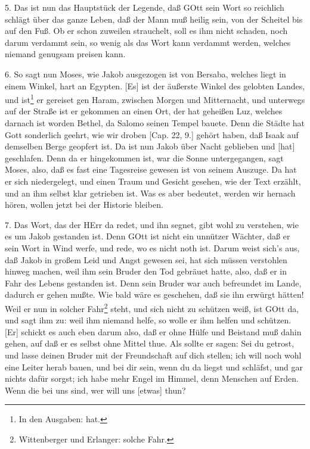 5. Das ist nun das Hauptstück der Legende, daß GOtt sein Wort so reichlich schlägt über das ganze Leben, daß der Mann muß heilig sein, von der Scheitel bis auf den Fuß. Ob er schon zuweilen strauchelt, soll es ihm nicht schaden, noch darum verdammt sein, so wenig als das Wort kann verdammt werden, welches niemand genugsam preisen kann.

6. So sagt nun Moses, wie Jakob ausgezogen ist von Bersaba, welches liegt in einem Winkel, hart an Egypten. [Es] ist der äußerste Winkel des gelobten Landes, und ist\footnote{In den Ausgaben: hat.} er gereiset gen Haram, zwischen Morgen und Mitternacht, und unterwegs auf der Straße ist er gekommen an einen Ort, der hat geheißen Luz, welches darnach ist worden Bethel, da Salomo seinen Tempel bauete. Denn die Städte hat Gott sonderlich geehrt, wie wir droben [Cap. 22, 9.] gehört haben, daß Isaak auf demselben Berge geopfert ist. Da ist nun Jakob über Nacht geblieben und [hat] geschlafen. Denn da er hingekommen ist, war die Sonne untergegangen, sagt Moses, also, daß es fast eine Tagesreise gewesen ist von seinem Auszuge. Da hat er sich niedergelegt, und einen Traum und Gesicht gesehen, wie der Text erzählt, und an ihm selbst klar getrieben ist. Was es aber bedeutet, werden wir hernach hören, wollen jetzt bei der Historie bleiben.

7. Das Wort, das der HErr da redet, und ihn segnet, gibt wohl zu verstehen, wie es um Jakob gestanden ist. Denn GOtt ist nicht ein unnützer Wächter, daß er sein Wort in Wind werfe, und rede, wo es nicht noth ist. Darum weist sich's aus, daß Jakob in großem Leid und Angst gewesen sei, hat sich müssen verstohlen hinweg machen, weil ihm sein Bruder den Tod gebräuet hatte, also, daß er in Fahr des Lebens gestanden ist. Denn sein Bruder war auch befreundet im Lande, dadurch er gehen mußte. Wie bald wäre es geschehen, daß sie ihn erwürgt hätten! Weil er nun in solcher Fahr\footnote{Wittenberger und Erlanger: solche Fahr.} steht, und sich nicht zu schützen weiß, ist GOtt da, und sagt ihm zu: weil ihm niemand helfe, so wolle er ihm helfen und schützen. [Er] schickt es auch eben darum also, daß er ohne Hülfe und Beistand muß dahin gehen, auf daß er es selbst ohne Mittel thue. Als sollte er sagen: Sei du getrost, und lasse deinen Bruder mit der Freundschaft auf dich stellen; ich will noch wohl eine Leiter herab bauen, und bei dir sein, wenn du da liegst und schläfst, und gar nichts dafür sorgst; ich habe mehr Engel im Himmel, denn Menschen auf Erden. Wenn die bei uns sind, wer will uns [etwas] thun?

